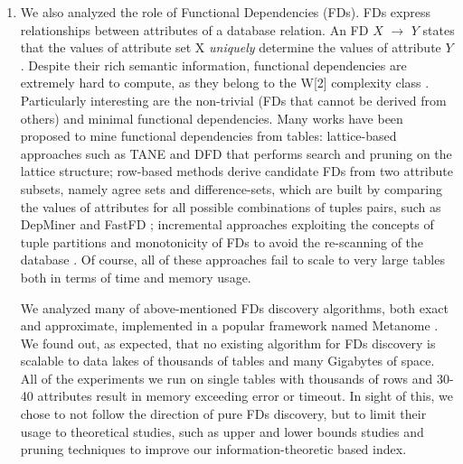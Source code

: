 \begin{enumerate}
    \item We also analyzed the role of Functional Dependencies (FDs). FDs express relationships between attributes of a database relation. An FD $X$ $\rightarrow$ $Y$ states that the values of attribute set X \textit{uniquely} determine the values of attribute $Y$. Despite their rich semantic information, functional dependencies are extremely hard to compute, as they belong to the W[2] complexity class \cite{blasius2017parameterized}. Particularly interesting are the non-trivial (FDs that cannot be derived from others) and minimal functional dependencies. Many works have been proposed to mine functional dependencies from tables: lattice-based approaches such as TANE \cite{huhtala1999tane} and DFD \cite{abedjan2014dfd} that performs search and pruning on the lattice structure; row-based methods derive candidate FDs from two attribute subsets, namely agree sets and difference-sets, which are built by comparing the values of attributes for all possible combinations of tuples pairs, such as DepMiner \cite{lopes2000efficient} and FastFD \cite{wyss2001fastfds}; incremental approaches exploiting the concepts of tuple partitions and monotonicity of FDs to avoid the re-scanning of the database \cite{wang2001incremental}. Of course, all of these approaches fail to scale to very large tables both in terms of time and memory usage. 

    We analyzed many of above-mentioned FDs discovery algorithms, both exact and approximate, implemented in a popular framework named Metanome \cite{papenbrock2015data}. We found out, as expected, that no existing algorithm for FDs discovery is scalable to data lakes of thousands of tables and many Gigabytes of space. All of the experiments we run on single tables with thousands of rows and 30-40 attributes result in memory exceeding error or timeout. In sight of this, we chose to not follow the direction of pure FDs discovery, but to limit their usage to theoretical studies, such as upper and lower bounds studies and pruning techniques to improve our information-theoretic based index.
    

\end{enumerate}
